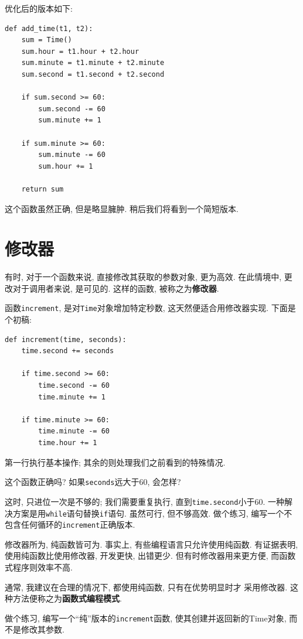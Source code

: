 \documentclass[10pt]{book}
\begin{document}
优化后的版本如下:

\begin{verbatim}
def add_time(t1, t2):
    sum = Time()
    sum.hour = t1.hour + t2.hour
    sum.minute = t1.minute + t2.minute
    sum.second = t1.second + t2.second

    if sum.second >= 60:
        sum.second -= 60
        sum.minute += 1

    if sum.minute >= 60:
        sum.minute -= 60
        sum.hour += 1

    return sum
\end{verbatim}
%
这个函数虽然正确, 但是略显臃肿. 
稍后我们将看到一个简短版本. 


\section{修改器}
\label{increment}

有时, 对于一个函数来说, 直接修改其获取的参数对象, 更为高效. 
在此情境中, 更改对于调用者来说, 是可见的. 
这样的函数, 被称之为{\bf 修改器}. 

函数{\tt increment}, 是对{\tt Time}对象增加特定秒数, 
这天然便适合用修改器实现. 
下面是个初稿:

\begin{verbatim}
def increment(time, seconds):
    time.second += seconds

    if time.second >= 60:
        time.second -= 60
        time.minute += 1

    if time.minute >= 60:
        time.minute -= 60
        time.hour += 1
\end{verbatim}
%
第一行执行基本操作;
其余的则处理我们之前看到的特殊情况. 

这个函数正确吗? 如果{\tt seconds}远大于60, 会怎样?

这时, 只进位一次是不够的;
我们需要重复执行, 直到{\tt time.second}小于60.
一种解决方案是用{\tt while}语句替换{\tt if}语句. 
虽然可行, 但不够高效. 
做个练习, 编写一个不包含任何循环的{\tt increment}正确版本. 

修改器所为, 纯函数皆可为. 
事实上, 有些编程语言只允许使用纯函数. 
有证据表明, 使用纯函数比使用修改器, 开发更快, 出错更少. 
但有时修改器用来更方便, 而函数式程序则效率不高. 

通常, 我建议在合理的情况下, 都使用纯函数, 只有在优势明显时才
采用修改器. 这种方法便称之为{\bf 函数式编程模式}. 

做个练习, 编写一个``纯''版本的{\tt increment}函数, 使其创建并返回新的Time对象, 
而不是修改其参数. 
\end{document}
